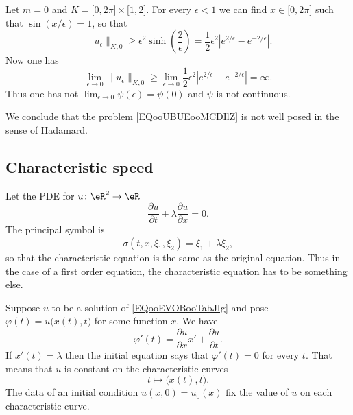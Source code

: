 \begin{example}
     Let \( m=0\) and \( K=\mathopen[ 0 , 2\pi \mathclose]\times\mathopen[ 1 , 2 \mathclose]\). For every \( \epsilon<1\) we can find \( x\in\mathopen[ 0 , 2\pi \mathclose]\) such that \( \sin(x/\epsilon)=1\), so that
     \begin{equation}
         \| u_{\epsilon} \|_{K,0}\geq \epsilon^2\sinh\left( \frac{ 2 }{ \epsilon } \right)=\frac{ 1 }{2}\epsilon^2|  e^{2/\epsilon}- e^{-2/\epsilon} |.
     \end{equation}
     Now one has
     \begin{equation}
         \lim_{\epsilon\to 0}\| u_{\epsilon} \|_{K,0}\geq \lim_{\epsilon\to 0}\frac{ 1 }{2}\epsilon^2|  e^{2/\epsilon}- e^{-2/\epsilon} |=\infty.
     \end{equation}
     Thus one has not \( \lim_{\epsilon\to 0}\psi(\epsilon)=\psi(0)\) and \( \psi\) is not continuous.

     We conclude that the problem \eqref{EQooUBUEooMCDIlZ} is not well posed in the sense of Hadamard.
\end{example}

\subsection{Characteristic speed}

Let the PDE for \( u\colon \eR^2\to \eR\)
\begin{equation}        \label{EQooEVOBooTabJIg}
    \frac{ \partial u }{ \partial t }+\lambda\frac{ \partial u }{ \partial x }=0.
\end{equation}
The principal symbol is
\begin{equation}
    \sigma(t,x,\xi_1,\xi_2)=\xi_1+\lambda \xi_2,
\end{equation}
so that the characteristic equation is the same as the original equation. Thus in the case of a first order equation, the characteristic equation has to be something else.

Suppose \( u\) to be a solution of \eqref{EQooEVOBooTabJIg} and pose \( \varphi(t)=u\big( x(t),t \big)\) for some function \( x\). We have
\begin{equation}
    \varphi'(t)=\frac{ \partial u }{ \partial x }x'+\frac{ \partial u }{ \partial t }.
\end{equation}
If \( x'(t)=\lambda\) then the initial equation says that \( \varphi'(t)=0\) for every \( t\). That means that \( u\) is constant on the characteristic curves
\begin{equation}
    t\mapsto \big( x(t),t \big).
\end{equation}
The data of an initial condition \( u(x,0)=u_0(x)\) fix the value of \( u\) on each characteristic curve.

